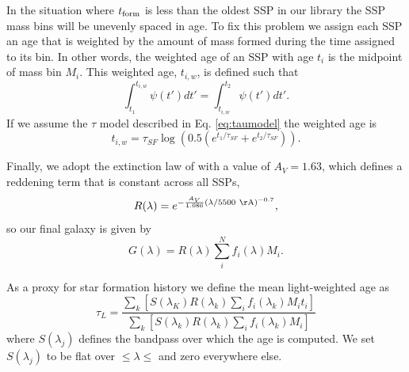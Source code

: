 \begin{appendices}
In the situation where $t_{\rm form}$ is less than the oldest SSP in
our library the SSP mass bins will be unevenly spaced in age. To fix
this problem we assign each SSP an age that is weighted by the amount
of mass formed during the time assigned to its bin. In other words,
the weighted age of an SSP with age $t_i$ is the midpoint of mass bin
$M_i$. This weighted age, $t_{i,w}$, is defined such that
\begin{equation}
\int_{t_1}^{t_{i,w}} \psi(t') dt' = \int_{t_{i,w}}^{t_2} \psi(t') dt'.
\end{equation}
If we assume the $\tau$ model described in Eq. \ref{eq:taumodel} the weighted age is
\begin{equation}
t_{i,w} = \tau_{SF} \log\left( 0.5 \left( e^{t_1/\tau_{SF}} + e^{t_2/\tau_{SF}} \right)\right).
\end{equation}

Finally, we adopt the extinction law of \citet{Charlot00} with a value
of $A_V=1.63$, which defines a reddening term that is constant across all SSPs, 
\begin{equation}
R(\lambda) = e^{-\frac{A_V}{1.086} \left(\lambda/\val{5500}{\AA}\right)^{-0.7}},
\end{equation}
 so our final galaxy is given by
\begin{equation}
G(\lambda) = R(\lambda)\sum_i^N f_i(\lambda) M_i.
\end{equation}

As a proxy for star formation history we define the mean light-weighted age as
\begin{equation}
\label{eq:MLWA}
\tau_L = \frac{\sum_k\left[S(\lambda_K) R(\lambda_k) \sum_i f_i(\lambda_k) M_i t_i\right]}{\sum_{k}\left[S(\lambda_k) R(\lambda_k) \sum_i f_i(\lambda_k) M_i\right]}
\end{equation}
where $S(\lambda_j)$ defines the bandpass over which the age is computed. We
set $S(\lambda_j)$ to be flat over  $\leq\lambda\leq$
 and zero everywhere else.

\end{appendices}
